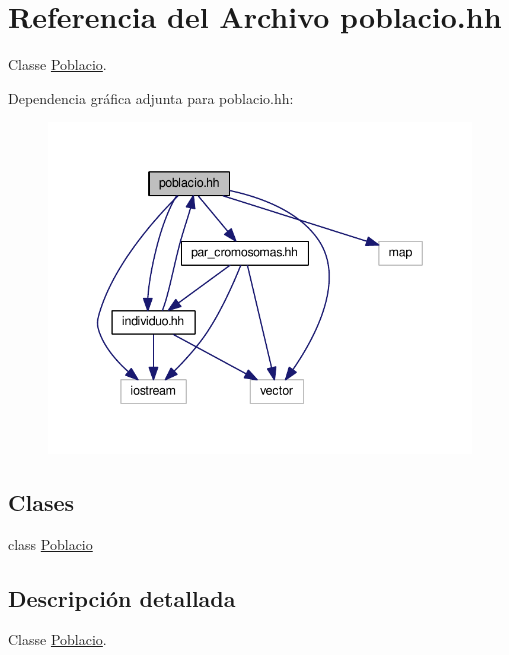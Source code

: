 \hypertarget{poblacio_8hh}{}\section{Referencia del Archivo poblacio.\+hh}
\label{poblacio_8hh}


Classe \hyperlink{class_poblacio}{Poblacio}.  


Dependencia gráfica adjunta para poblacio.\+hh\+:
\nopagebreak
\begin{figure}[H]
\begin{center}
\leavevmode
\includegraphics[width=343pt]{poblacio_8hh__incl}
\end{center}
\end{figure}
\subsection*{Clases}
\begin{DoxyCompactItemize}
\item 
class \hyperlink{class_poblacio}{Poblacio}
\end{DoxyCompactItemize}


\subsection{Descripción detallada}
Classe \hyperlink{class_poblacio}{Poblacio}. 

